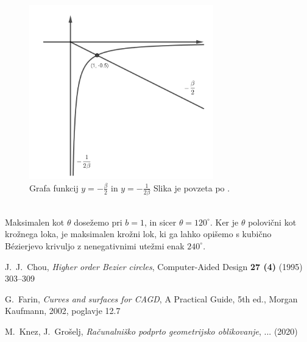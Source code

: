 \documentclass[a4paper,11pt]{article}
\theoremstyle{definition}
\theoremstyle{plain}
\begin{document}
\begin{figure}[ht!]
    \centering
    \includegraphics[width=80mm]{graf.png}
    \caption{Grafa funkcij $y=-\frac{\beta}{2}$ in $y=-\frac{1}{2\beta}$ Slika je povzeta po \cite{chou}.}
    \label{slika:graf}
\end{figure}
\\
Maksimalen kot $\theta$ dosežemo pri $b=1$, in sicer $\theta=120^{\circ}$. Ker je $\theta$ polovični kot krožnega loka, je maksimalen krožni lok, ki ga lahko opišemo s kubično B\'ezierjevo krivuljo z nenegativnimi utežmi enak $240^{\circ}$.

\begin{thebibliography}{99}
J.~J.~Chou, \emph{Higher order Bezier circles}, Computer-Aided Design \textbf{27 (4)} (1995) 303--309

G.~Farin, \emph{Curves and surfaces for CAGD}, A Practical Guide, 5th ed., Morgan Kaufmann, 2002, poglavje 12.7

M.~Knez, J.~Grošelj, \emph{Računalniško podprto geometrijsko oblikovanje}, ... (2020)
\end{thebibliography}
\end{document}
